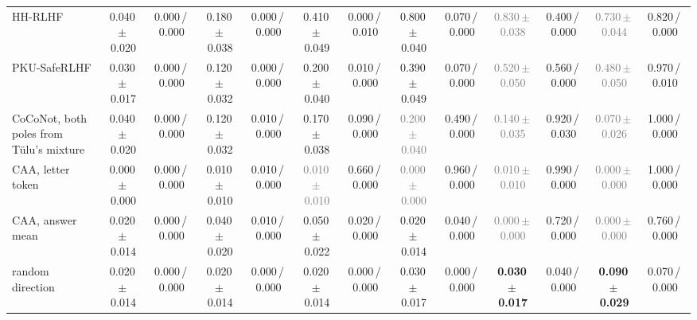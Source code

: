 \begin{tabular}{@{}lcccccccccccc@{}}
HH-RLHF & 0.040\,{\scriptsize$\pm$\,0.020} & {\scriptsize 0.000\,/\,0.000} & 0.180\,{\scriptsize$\pm$\,0.038} & {\scriptsize 0.000\,/\,0.000} & 0.410\,{\scriptsize$\pm$\,0.049} & {\scriptsize 0.000\,/\,0.010} & 0.800\,{\scriptsize$\pm$\,0.040} & {\scriptsize 0.070\,/\,0.000} & \textcolor{gray}{0.830\,{\scriptsize$\pm$\,0.038}} & {\scriptsize 0.400\,/\,0.000} & \textcolor{gray}{0.730\,{\scriptsize$\pm$\,0.044}} & {\scriptsize 0.820\,/\,0.000} \\
PKU-SafeRLHF & 0.030\,{\scriptsize$\pm$\,0.017} & {\scriptsize 0.000\,/\,0.000} & 0.120\,{\scriptsize$\pm$\,0.032} & {\scriptsize 0.000\,/\,0.000} & 0.200\,{\scriptsize$\pm$\,0.040} & {\scriptsize 0.010\,/\,0.000} & 0.390\,{\scriptsize$\pm$\,0.049} & {\scriptsize 0.070\,/\,0.000} & \textcolor{gray}{0.520\,{\scriptsize$\pm$\,0.050}} & {\scriptsize 0.560\,/\,0.000} & \textcolor{gray}{0.480\,{\scriptsize$\pm$\,0.050}} & {\scriptsize 0.970\,/\,0.010} \\
CoCoNot, both poles from T\"ulu's mixture & 0.040\,{\scriptsize$\pm$\,0.020} & {\scriptsize 0.000\,/\,0.000} & 0.120\,{\scriptsize$\pm$\,0.032} & {\scriptsize 0.010\,/\,0.000} & 0.170\,{\scriptsize$\pm$\,0.038} & {\scriptsize 0.090\,/\,0.000} & \textcolor{gray}{0.200\,{\scriptsize$\pm$\,0.040}} & {\scriptsize 0.490\,/\,0.000} & \textcolor{gray}{0.140\,{\scriptsize$\pm$\,0.035}} & {\scriptsize 0.920\,/\,0.030} & \textcolor{gray}{0.070\,{\scriptsize$\pm$\,0.026}} & {\scriptsize 1.000\,/\,0.000} \\
CAA, letter token & 0.000\,{\scriptsize$\pm$\,0.000} & {\scriptsize 0.000\,/\,0.000} & 0.010\,{\scriptsize$\pm$\,0.010} & {\scriptsize 0.010\,/\,0.000} & \textcolor{gray}{0.010\,{\scriptsize$\pm$\,0.010}} & {\scriptsize 0.660\,/\,0.000} & \textcolor{gray}{0.000\,{\scriptsize$\pm$\,0.000}} & {\scriptsize 0.960\,/\,0.000} & \textcolor{gray}{0.010\,{\scriptsize$\pm$\,0.010}} & {\scriptsize 0.990\,/\,0.000} & \textcolor{gray}{0.000\,{\scriptsize$\pm$\,0.000}} & {\scriptsize 1.000\,/\,0.000} \\
CAA, answer mean & 0.020\,{\scriptsize$\pm$\,0.014} & {\scriptsize 0.000\,/\,0.000} & 0.040\,{\scriptsize$\pm$\,0.020} & {\scriptsize 0.010\,/\,0.000} & 0.050\,{\scriptsize$\pm$\,0.022} & {\scriptsize 0.020\,/\,0.000} & 0.020\,{\scriptsize$\pm$\,0.014} & {\scriptsize 0.040\,/\,0.000} & \textcolor{gray}{0.000\,{\scriptsize$\pm$\,0.000}} & {\scriptsize 0.720\,/\,0.000} & \textcolor{gray}{0.000\,{\scriptsize$\pm$\,0.000}} & {\scriptsize 0.760\,/\,0.000} \\
random direction & 0.020\,{\scriptsize$\pm$\,0.014} & {\scriptsize 0.000\,/\,0.000} & 0.020\,{\scriptsize$\pm$\,0.014} & {\scriptsize 0.000\,/\,0.000} & 0.020\,{\scriptsize$\pm$\,0.014} & {\scriptsize 0.000\,/\,0.000} & 0.030\,{\scriptsize$\pm$\,0.017} & {\scriptsize 0.000\,/\,0.000} & \textbf{0.030\,{\scriptsize$\pm$\,0.017}} & {\scriptsize 0.040\,/\,0.000} & \textbf{0.090\,{\scriptsize$\pm$\,0.029}} & {\scriptsize 0.070\,/\,0.000} \\
\bottomrule
\end{tabular}
